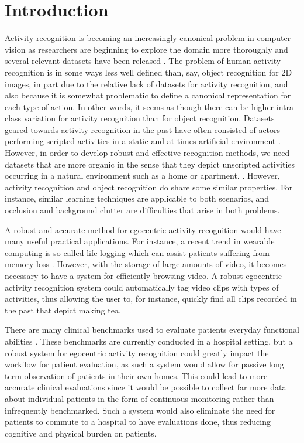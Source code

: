 \documentclass[10pt,twocolumn,letterpaper]{article}
\begin{document}
\section{Introduction}
	Activity recognition is becoming an increasingly canonical problem in
	computer vision as researchers are beginning to explore the domain more
  thoroughly and several relevant datasets have been released \cite{Schuldt04, Rodriguez08}. The problem 
	of human activity recognition is in some ways less well defined
	than, say, object recognition for 2D images, in part due to the relative
	lack of datasets for activity recognition, and also because it is somewhat
	problematic to define a canonical representation for each type of action.
	In other words, it seems as though there can be higher intra-class
	variation for activity recognition than for object recognition. 
	Datasets geared towards activity recognition in the past have often
	consisted of actors performing scripted activities in a static and at
  times artificial environment \cite{Schuldt04}. However, in order to develop robust and effective
	recognition methods, we need datasets that are more organic in the sense that they
	depict unscripted activities occurring in a natural environment such as a home or
	apartment.
	\cite{Ramanan12}. 
	However, activity recognition and object recognition do share some
	similar properties. For instance, similar learning techniques are applicable to both
  scenarios, and occlusion and background clutter are
	difficulties that arise in both problems.

	A robust and accurate method for egocentric activity recognition would have 
	many useful practical applications. For instance,
	a recent trend in wearable computing is so-called life logging which can
	assist patients suffering from memory loss \cite{Sellen07}. However, with
	the storage of large amounts of video, it becomes necessary to have a system for
	efficiently browsing video. A robust egocentric activity recognition
	system could automatically tag video clips with types of activities,
	thus allowing the user to, for
	instance, quickly find all clips recorded in the past that depict making tea.

	There are many clinical benchmarks used to evaluate patients everyday
	functional abilities \cite{Kopp97, Catz97, Itzkovich07}. 
	These benchmarks are currently conducted in a
	hospital setting, but a robust system for egocentric activity recognition
	could greatly impact the workflow for patient evaluation, as such a system
	would allow for passive long term observation of patients in their own
	homes. This could lead to more accurate clinical evaluations since it would be
	possible to collect far more data about individual patients in the form of continuous 
  monitoring rather than infrequently benchmarked. Such a system
	would also eliminate the need for patients to commute to a hospital to have
	evaluations done, thus reducing cognitive and physical burden on patients.
	
\end{document}
